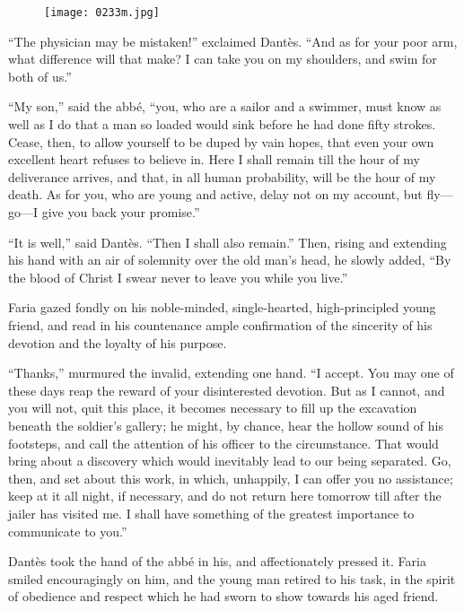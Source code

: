 \begin{figure}[ht]
\texttt{[image: 0233m.jpg]}
\end{figure}

“The physician may be mistaken!” exclaimed Dantès. “And as for your
poor arm, what difference will that make? I can take you on my
shoulders, and swim for both of us.”

“My son,” said the abbé, “you, who are a sailor and a swimmer, must
know as well as I do that a man so loaded would sink before he had done
fifty strokes. Cease, then, to allow yourself to be duped by vain
hopes, that even your own excellent heart refuses to believe in. Here I
shall remain till the hour of my deliverance arrives, and that, in all
human probability, will be the hour of my death. As for you, who are
young and active, delay not on my account, but fly—go—I give you back
your promise.”

“It is well,” said Dantès. “Then I shall also remain.” Then, rising and
extending his hand with an air of solemnity over the old man’s head, he
slowly added, “By the blood of Christ I swear never to leave you while
you live.”

Faria gazed fondly on his noble-minded, single-hearted, high-principled
young friend, and read in his countenance ample confirmation of the
sincerity of his devotion and the loyalty of his purpose.

“Thanks,” murmured the invalid, extending one hand. “I accept. You may
one of these days reap the reward of your disinterested devotion. But
as I cannot, and you will not, quit this place, it becomes necessary to
fill up the excavation beneath the soldier’s gallery; he might, by
chance, hear the hollow sound of his footsteps, and call the attention
of his officer to the circumstance. That would bring about a discovery
which would inevitably lead to our being separated. Go, then, and set
about this work, in which, unhappily, I can offer you no assistance;
keep at it all night, if necessary, and do not return here tomorrow
till after the jailer has visited me. I shall have something of the
greatest importance to communicate to you.”

Dantès took the hand of the abbé in his, and affectionately pressed it.
Faria smiled encouragingly on him, and the young man retired to his
task, in the spirit of obedience and respect which he had sworn to show
towards his aged friend.
